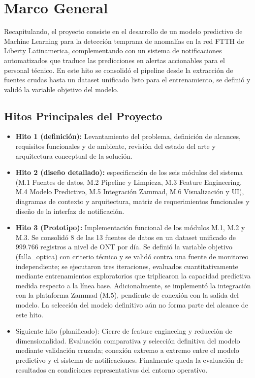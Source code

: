 \documentclass[12pt,a4paper]{article}
\begin{document}
\section{Marco General}
\noindent
Recapitulando, el proyecto consiste en el desarrollo de un modelo predictivo
de Machine Learning para la detección temprana de anomalías en la red FTTH de Liberty Latinamerica, complementando con
un sistema de notificaciones automatizados que traduce las predicciones en alertas accionables
para el personal técnico.  En este hito se consolidó el pipeline desde la extracción de fuentes crudas
hasta un dataset unificado listo para el entrenamiento, se definió y validó la variable objetivo del modelo.

\subsection{Hitos Principales del Proyecto}

\begin{itemize}
    \item \textbf{Hito 1 (definición):} Levantamiento del problema, definición de alcances, requisitos funcionales y de ambiente, revisión del estado del arte
    y arquitectura conceptual de la solución.
    \item \textbf{Hito 2 (diseño detallado):} especificación de los seis módulos del sistema (M.1 Fuentes de datos, M.2 Pipeline y Limpieza, M.3 Feature Engineering, M.4 Modelo Predictivo, M.5 Integración Zammad, M.6 Visualización y UI), diagramas de contexto y arquitectura,
    matriz de requerimientos funcionales y diseño de la interfaz de notificación.
    \item \textbf{Hito 3 (Prototipo):} Implementación funcional de los módulos M.1, M.2 y M.3. Se consolidó 8 de las 13 fuentes de datos en un dataset unificado de 999.766 registros a nivel de ONT por día. Se definió
    la variable objetivo (falla\_optica) con criterio técnico y se validó contra una fuente de monitoreo independiente; se ejecutaron tres iteraciones, evaluados cuantitativamente mediante entrenamientos exploratorios
    que triplicaron la capacidad predictiva medida respecto a la línea base. Adicionalmente, se implementó la integración con la plataforma Zammad (M.5), pendiente de conexión con la salida del modelo. La selección
    del modelo definitivo aún no forma parte del alcance de este hito.
    
    \item Siguiente hito (planificado): Cierre de feature engineeing y reducción de dimensionalidad. Evaluación comparativa
    y selección definitiva del modelo mediante validación cruzada; conexión extremo a extremo entre el modelo predictivo y el sistema de notificaciones. Finalmente queda la evaluación de resultados en condiciones representativas del entorno operativo.
\end{itemize}
\end{document}
